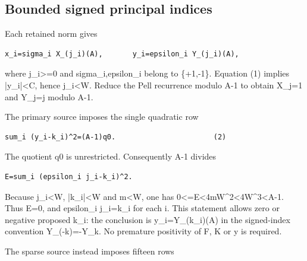 \subsection{Bounded signed principal indices}



Each retained norm gives



\begin{verbatim}
x_i=sigma_i X_(j_i)(A),       y_i=epsilon_i Y_(j_i)(A),
\end{verbatim}

where j\_\allowbreak{}i\textgreater{}\allowbreak{}=\allowbreak{}0 and sigma\_\allowbreak{}i,epsilon\_\allowbreak{}i belong to \{+\allowbreak{}1,-1\}. Equation (1) implies |y\_\allowbreak{}i|\textless{}\allowbreak{}C, hence j\_\allowbreak{}i\textless{}\allowbreak{}W. Reduce the Pell recurrence modulo A-1 to obtain X\_\allowbreak{}j=\allowbreak{}1 and Y\_\allowbreak{}j=\allowbreak{}j modulo A-1.



The primary source imposes the single quadratic row



\begin{verbatim}
sum_i (y_i-k_i)^2=(A-1)q0.                       (2)
\end{verbatim}

The quotient q0 is unrestricted. Consequently A-1 divides



\begin{verbatim}
E=sum_i (epsilon_i j_i-k_i)^2.
\end{verbatim}

Because j\_\allowbreak{}i\textless{}\allowbreak{}W, |k\_\allowbreak{}i|\textless{}\allowbreak{}W and m\textless{}\allowbreak{}W, one has 0\textless{}\allowbreak{}=\allowbreak{}E\textless{}\allowbreak{}4mW\textasciicircum{}\allowbreak{}2\textless{}\allowbreak{}4W\textasciicircum{}\allowbreak{}3\textless{}\allowbreak{}A-1. Thus E=\allowbreak{}0, and epsilon\_\allowbreak{}i j\_\allowbreak{}i=\allowbreak{}k\_\allowbreak{}i for each i. This statement allows zero or negative proposed k\_\allowbreak{}i: the conclusion is y\_\allowbreak{}i=\allowbreak{}Y\_\allowbreak{}(k\_\allowbreak{}i)(A) in the signed-index convention Y\_\allowbreak{}(-k)=\allowbreak{}-Y\_\allowbreak{}k. No premature positivity of F, K or y is required.



The sparse source instead imposes fifteen rows



